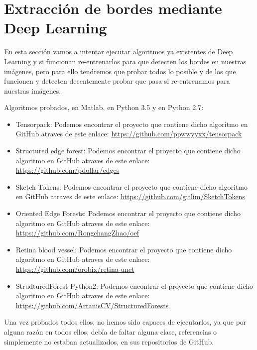 \section{Extracción de bordes mediante Deep Learning}


En esta sección vamos a intentar ejecutar algoritmos ya existentes de Deep Learning y si funcionan re-entrenarlos para que detecten los bordes en nuestras imágenes, pero para ello tendremos que probar todos lo posible y de los que funcionen y detecten decentemente probar que pasa si re-entrenamos para nuestras imágenes.

Algoritmos probados, en Matlab, en Python 3.5 y en Python 2.7:
\begin{itemize}
\item Tensorpack: Podemos encontrar el proyecto que contiene dicho algoritmo en GitHub atraves de este enlace: \url{https://github.com/ppwwyyxx/tensorpack}

\item Structured edge forest: Podemos encontrar el proyecto que contiene dicho algoritmo en GitHub atraves de este enlace: \url{https://github.com/pdollar/edges}

\item Sketch Tokens: Podemos encontrar el proyecto que contiene dicho algoritmo en GitHub atraves de este enlace: \url{https://github.com/gitlim/SketchTokens}

\item Oriented Edge Forests: Podemos encontrar el proyecto que contiene dicho algoritmo en GitHub atraves de este enlace: \url{https://github.com/RongchangZhao/oef}

\item Retina blood vessel: Podemos encontrar el proyecto que contiene dicho algoritmo en GitHub atraves de este enlace: \url{https://github.com/orobix/retina-unet}

\item StrudturedForest Python2: Podemos encontrar el proyecto que contiene dicho algoritmo en GitHub atraves de este enlace: \url{https://github.com/ArtanisCV/StructuredForests}
\end{itemize}

Una vez probados todos ellos, no hemos sido capaces de ejecutarlos, ya que por alguna razón en todos ellos, debía de faltar alguna clase, referencias o simplemente no estaban actualizados, en sus repositorios de GitHub.
